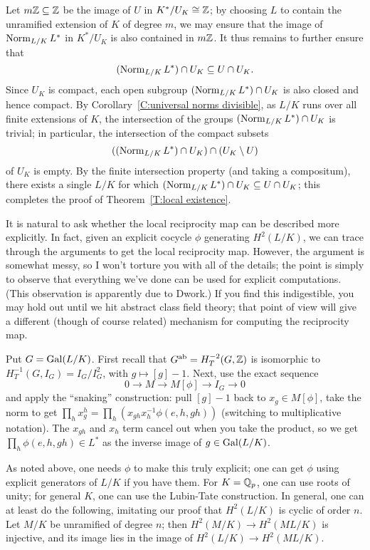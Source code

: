Let $m\mathbb{Z} \subseteq \mathbb{Z}$ be the image of $U$ in $K^*/U_K \cong \mathbb{Z}$;
by choosing $L$ to contain the unramified extension of $K$ of degree $m$,
we may ensure that the image of $\operatorname{Norm}_{L/K} L^*$ in $K^*/U_K$ is also contained in $m\mathbb{Z}$.
It thus remains to further ensure that 
\[
(\operatorname{Norm}_{L/K} L^*) \cap U_K \subseteq U \cap U_K.
\]
Since $U_K$ is compact, each open subgroup $(\operatorname{Norm}_{L/K}L^*) \cap U_K$ is also closed and hence compact. By Corollary~\ref{C:universal norms divisible}, as $L/K$ runs over all finite extensions of $K$,
the intersection of the groups $(\operatorname{Norm}_{L/K} L^*) \cap U_K$ is trivial; in particular, the intersection of the compact subsets 
\[
((\operatorname{Norm}_{L/K} L^*) \cap U_K) \cap (U_K \setminus U)
\]
of $U_K$ is empty. By the finite intersection property (and taking a compositum), there exists a single $L/K$ for which $(\operatorname{Norm}_{L/K} L^*) \cap U_K \subseteq U \cap U_K$;
this completes the proof of Theorem~\ref{T:local existence}.



It is natural to ask whether the local reciprocity map can be described more explicitly. In fact, given an explicit cocycle $\phi$ generating $H^2(L/K)$, we can trace 
through the arguments to get the local reciprocity map. However, the argument is somewhat messy, so I won't torture you with all of the details; the point is
simply to observe that everything we've done can be used for explicit
computations. (This observation is apparently due to Dwork.) If you find
this indigestible, you may hold out until we hit abstract class field theory; that
point of view will give a different (though of course related) mechanism
for computing the reciprocity map.

Put $G = \operatorname{Gal}(L/K)$.
First recall
that $G^{\operatorname{ab}} = H^{-2}_T(G, \mathbb{Z})$ is isomorphic to $H^{-1}_T(G, I_G)
= I_G/I_G^2$, with $g \mapsto [g]-1$. Next, use the exact sequence
\[
0 \to M \to M[\phi] \to I_G \to 0
\]
and apply the ``snaking'' construction: pull $[g]-1$ back to
$x_g \in M[\phi]$, take the norm to get $\prod_h x_g^h = \prod_h
(x_{gh} x_h^{-1} \phi(e,h,gh))$ (switching to multiplicative notation).
The $x_{gh}$ and $x_h$ term cancel out when you take the product, so we
get $\prod_h \phi(e, h, gh) \in L^*$ as the inverse image of $g \in \operatorname{Gal}(L/K)$.

As noted above, one needs $\phi$ to make this truly explicit; one can get
$\phi$ using explicit generators of $L/K$ if you have them. For $K = \mathbb{Q}_p$,
one can use roots of unity; for general $K$, one can use the Lubin-Tate
construction. In general, one can at least do the following, imitating
our proof that $H^2(L/K)$ is cyclic of order $n$. Let $M/K$
be unramified of degree $n$; then $H^2(M/K) \to H^2(ML/K)$ is injective,
and its image lies in the image of $H^2(L/K) \to H^2(ML/K)$.

